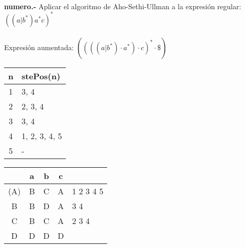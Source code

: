 \paragraph{}
\textbf{{numero}.-} Aplicar el algoritmo de Aho-Sethi-Ullman a la expresión regular: \textbf{$ ((a|b^*)a^*c)^* $} \\
\\
Expresión aumentada: $ ((((a|b^*)\cdot a^*)\cdot c)^*\cdot \$ ) $ \\

\begin{tabular} {| c | l |}
\hline
n & stePos(n) \\ \hline
1 & 3, 4 \\ \hline
2 & 2, 3, 4 \\ \hline
3 & 3, 4 \\ \hline
4 & 1, 2, 3, 4, 5 \\ \hline
5 & - \\ \hline
\end{tabular}
\quad
\begin{tabular} {| c | c |c |c | l |}
\hline 
& a & b & c & \\ \hline
(A) & B & C & A & 1 2 3 4 5 \\ \hline
B & B & D & A & 3 4 \\ \hline
C & B & C & A & 2 3 4 \\ \hline
D & D & D & D & \\ \hline
\end{tabular}